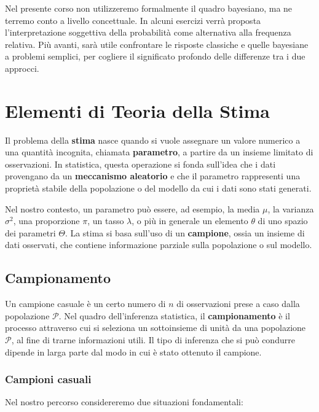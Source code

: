 \documentclass[
  11pt,
]{book}
\theoremstyle{mytheoremstyle}
\theoremstyle{mydefstyle}
\begin{document}
Nel presente corso non utilizzeremo formalmente il quadro bayesiano, ma ne terremo conto a livello concettuale. In alcuni esercizi verrà proposta l'interpretazione soggettiva della probabilità come alternativa alla frequenza relativa. Più avanti, sarà utile confrontare le risposte classiche e quelle bayesiane a problemi semplici, per cogliere il significato profondo delle differenze tra i due approcci.

\chapter{Elementi di Teoria della Stima}\label{elementi-di-teoria-della-stima}

Il problema della \textbf{stima} nasce quando si vuole assegnare un valore numerico a una quantità incognita, chiamata \textbf{parametro}, a partire da un insieme limitato di osservazioni. In statistica, questa operazione si fonda sull'idea che i dati provengano da un \textbf{meccanismo aleatorio} e che il parametro rappresenti una proprietà stabile della popolazione o del modello da cui i dati sono stati generati.

Nel nostro contesto, un parametro può essere, ad esempio, la media \(\mu\), la varianza \(\sigma^2\), una proporzione \(\pi\), un tasso \(\lambda\), o più in generale un elemento \(\theta\) di uno spazio dei parametri \(\Theta\). La stima si basa sull'uso di un \textbf{campione}, ossia un insieme di dati osservati, che contiene informazione parziale sulla popolazione o sul modello.

\section{Campionamento}\label{campionamento}

Un campione casuale è un certo numero di \(n\) di osservazioni prese a caso dalla popolazione \(\mathscr{P}\). Nel quadro dell'inferenza statistica, il \textbf{campionamento} è il processo attraverso cui si seleziona un sottoinsieme di unità da una popolazione \(\mathscr{P}\), al fine di trarne informazioni utili. Il tipo di inferenza che si può condurre dipende in larga parte dal modo in cui è stato ottenuto il campione.

\subsection{Campioni casuali}\label{campioni-casuali}

Nel nostro percorso considereremo due situazioni fondamentali:
\end{document}
